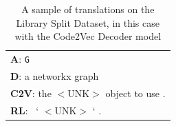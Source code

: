 \begin{table}[ht]
{\begin{tabular}{l}
    \textbf{A}: \texttt{G}\\
    \textbf{D}: a networkx graph\\
    \textbf{C2V}: the $<$UNK$>$ object to use .\\
    \textbf{RL}: \ ` $<$UNK$>$ ` . \\

    \hline

    \hline
    \end{tabular}
    }

    \caption{A sample of translations on the Library Split Dataset, in this case with the Code2Vec Decoder model}
    \label{tab:lib_split}
\end{table}



